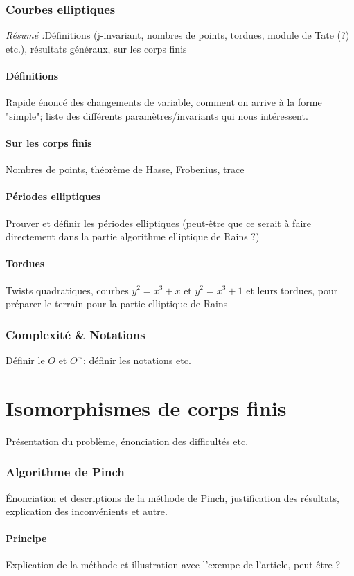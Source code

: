 \documentclass[a4paper]{article} %
\numberwithin{section}{part}
\numberwithin{equation}{section}
\begin{document}
\section{Courbes elliptiques}
\textit{Résumé :}Définitions (j-invariant, nombres de points, tordues, module de
Tate (?) etc.), résultats généraux, sur les corps finis
\subsection{Définitions}
Rapide énoncé des changements de variable, comment on arrive à la forme
"simple"; liste des différents paramètres/invariants qui nous intéressent.
\subsection{Sur les corps finis}
Nombres de points, théorème de Hasse, Frobenius, trace
\subsection{Périodes elliptiques}
Prouver et définir les périodes elliptiques (peut-être que ce serait à
faire directement dans la partie algorithme elliptique de Rains ?)
\subsection{Tordues}
Twists quadratiques, courbes $y^2 = x^3 + x$ et $y^2 = x^3 + 1$ et leurs
tordues, pour préparer le terrain pour la partie elliptique de Rains

\section{Complexité \& Notations}
Définir le $O$ et $O^{\sim}$; définir les notations etc.


\part{Isomorphismes de corps finis}
Présentation du problème, énonciation des difficultés etc.

\section{Algorithme de Pinch}
Énonciation et descriptions de la méthode de Pinch, justification des 
résultats, explication des inconvénients et autre.
\subsection{Principe}
Explication de la méthode et illustration avec l'exempe de l'article, peut-être
?
\end{document}
